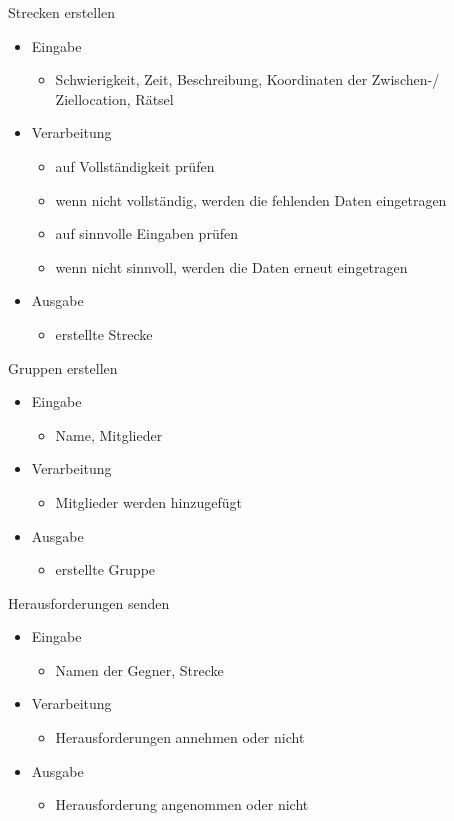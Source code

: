\documentclass[a4paper, 12pt]{article}
\begin{document}
\bigskip
{\Large Strecken erstellen}\\
\begin{itemize}
\item Eingabe
	\begin{itemize}
	\item Schwierigkeit, Zeit, Beschreibung, Koordinaten der Zwischen-/ Ziellocation, Rätsel
	\end{itemize}
\item Verarbeitung
	\begin{itemize}
	\item auf Vollständigkeit prüfen
	\item wenn nicht vollständig, werden die fehlenden Daten eingetragen
	\item auf sinnvolle Eingaben prüfen
	\item wenn nicht sinnvoll, werden die Daten erneut eingetragen
	\end{itemize}
\item Ausgabe
	\begin{itemize}
	\item erstellte Strecke
	\end{itemize}
\end{itemize}

\bigskip
{\Large Gruppen erstellen}\\
\begin{itemize}
\item Eingabe
	\begin{itemize}
	\item Name, Mitglieder
	\end{itemize}
\item Verarbeitung
	\begin{itemize}
	\item Mitglieder werden hinzugefügt
	\end{itemize}
\item Ausgabe
	\begin{itemize}
	\item erstellte Gruppe
	\end{itemize}
\end{itemize}

\bigskip
{\Large Herausforderungen senden}\\
\begin{itemize}
\item Eingabe
	\begin{itemize}
	\item Namen der Gegner, Strecke
	\end{itemize}
\item Verarbeitung
	\begin{itemize}
	\item Herausforderungen annehmen oder nicht
	\end{itemize}
\item Ausgabe
	\begin{itemize}
	\item Herausforderung angenommen oder nicht
	\end{itemize}
\end{itemize}
\end{document}
